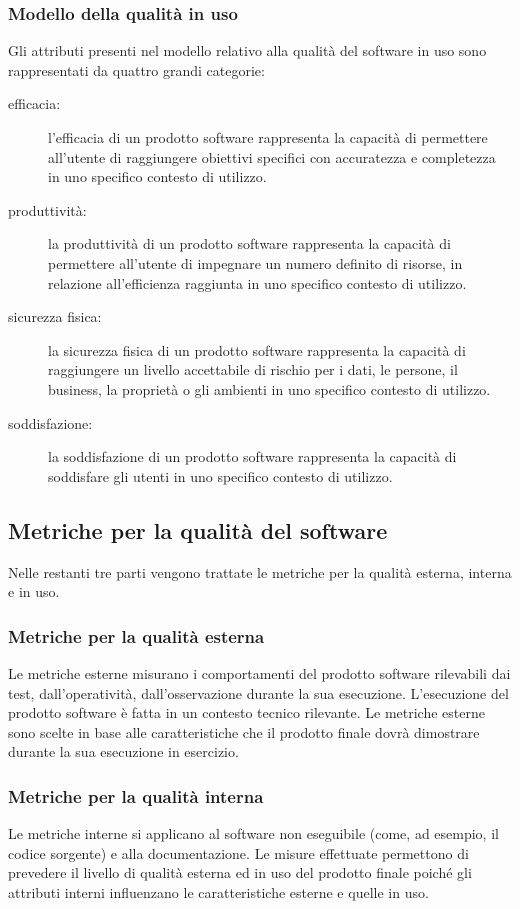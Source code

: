 \documentclass[../PianoDiQualifica.tex]{subfiles}
\begin{document}
\begin{appendices}
		\subsubsection{Modello della qualità in uso}
		Gli attributi presenti nel modello relativo alla qualità del software in uso sono rappresentati da quattro grandi categorie:
		\begin{description}
			\item[efficacia:] l'efficacia di un prodotto software rappresenta la capacità di permettere all'utente di raggiungere obiettivi specifici con accuratezza e completezza in uno specifico contesto di utilizzo.
			\item[produttività:] la produttività di un prodotto software rappresenta la capacità di permettere all'utente di impegnare un numero definito di risorse, in relazione all’efficienza raggiunta in uno specifico contesto di utilizzo.
			\item[sicurezza fisica:] la sicurezza fisica di un prodotto software rappresenta la capacità di raggiungere un livello accettabile di rischio per i dati, le persone, il business, la proprietà o gli ambienti in uno specifico contesto di utilizzo.
			\item[soddisfazione:] la soddisfazione di un prodotto software rappresenta la capacità di soddisfare gli utenti in uno specifico contesto di utilizzo.
		\end{description}
	
	\subsection{Metriche per la qualità del software}
	Nelle restanti tre parti vengono trattate le metriche per la qualità esterna, interna e in uso.
	
	\subsubsection{Metriche per la qualità esterna}
	Le metriche esterne misurano i comportamenti del prodotto software rilevabili dai test, dall'operatività, dall'osservazione durante la sua esecuzione. L'esecuzione del prodotto software è fatta in un contesto tecnico rilevante.
	Le metriche esterne sono scelte in base alle caratteristiche che il prodotto finale dovrà dimostrare durante la sua esecuzione in esercizio.
	
	\subsubsection{Metriche per la qualità interna}
	Le metriche interne si applicano al software non eseguibile (come, ad esempio, il codice sorgente) e alla documentazione. Le misure effettuate permettono di prevedere il livello di qualità esterna ed in uso del prodotto finale poiché gli attributi interni influenzano le caratteristiche esterne e quelle in uso.
	

\end{appendices}
\end{document}
